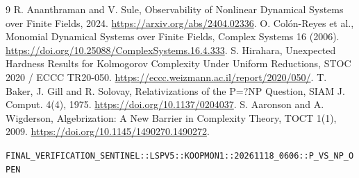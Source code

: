 \documentclass[11pt]{article}
\begin{document}
\begin{thebibliography}{9}
 R. Ananthraman and V. Sule, Observability of Nonlinear Dynamical Systems over Finite Fields, 2024. \url{https://arxiv.org/abs/2404.02336}.
 O. Col\'on-Reyes et al., Monomial Dynamical Systems over Finite Fields, Complex Systems 16 (2006). \url{https://doi.org/10.25088/ComplexSystems.16.4.333}.
 S. Hirahara, Unexpected Hardness Results for Kolmogorov Complexity Under Uniform Reductions, STOC 2020 / ECCC TR20-050. \url{https://eccc.weizmann.ac.il/report/2020/050/}.
 T. Baker, J. Gill and R. Solovay, Relativizations of the P=?NP Question, SIAM J. Comput. 4(4), 1975. \url{https://doi.org/10.1137/0204037}.
 S. Aaronson and A. Wigderson, Algebrization: A New Barrier in Complexity Theory, TOCT 1(1), 2009. \url{https://doi.org/10.1145/1490270.1490272}.
\end{thebibliography}
\noindent\texttt{FINAL\_VERIFICATION\_SENTINEL::LSPV5::KOOPMON1::20261118\_0606::P\_VS\_NP\_OPEN}
\end{document}

